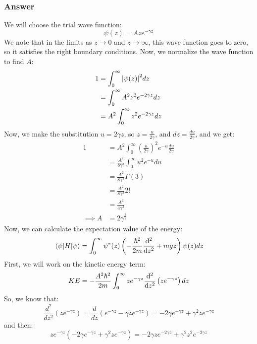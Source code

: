 \documentclass{article}[16pt]
\begin{document}
\subsubsection{Answer}
We will choose the trial wave function:
\begin{equation}
    \psi(z) = Aze^{-\gamma  z}
\end{equation}
We note that in the limits as $z \to 0$ and $z \to \infty$, this wave function goes to zero, so it satisfies the right boundary conditions. Now, we normalize the wave function to find $A$:
\begin{align*}
    1 &= \int_{0}^{\infty} \abs{\psi(z)}^2 dz \\
    &= \int_{0}^{\infty} A^2 z^2 e^{-2\gamma z} dz \\
    &= A^2 \int_{0}^{\infty} z^2 e^{-2\gamma z} dz \\
\end{align*}
Now, we make the substitution $u = 2\gamma z$, so $z = \frac{u}{2\gamma }$, and $dz = \frac{du}{2\gamma}$, and we get:
\begin{align*}
    1 &= A^2 \int_{0}^{\infty} \left(\frac{u}{2\gamma}\right)^2 e^{-u} \frac{du}{2\gamma} \\
    &= \frac{A^2}{8\gamma^3} \int_{0}^{\infty} u^2 e^{-u} du \\
    &= \frac{A^2}{8\gamma^3} \Gamma(3) \\
    &= \frac{A^2}{8\gamma^3} 2! \\
    &= \frac{A^2}{4\gamma^3} \\
    \implies A &= \boxed{2\gamma^{\frac{3}{2}}}
\end{align*}
Now, we can calculate the expectation value of the energy:
\begin{equation}
    \expval{H}{\psi} = \int_{0}^{\infty} \psi^*(z) \left(-\frac{\hbar^2}{2m} \dv[2]{z} + mgz\right) \psi(z) dz
\end{equation}
First, we will work on the kinetic energy term:
\begin{align*}
    KE &= -\frac{A^2\hbar^2}{2m} \int_{0}^{\infty} ze^{-\gamma z} \dv[2]{z} \left(ze^{-\gamma z}\right) dz \\
\end{align*}
So, we know that:
\begin{equation}
    \frac{d^2}{dz^2} \left(ze^{-\gamma z}\right) = \frac{d}{dz} \left(e^{-\gamma z} - \gamma ze^{-\gamma z}\right) = -2\gamma e^{-\gamma z} + \gamma^2 ze^{-\gamma z}
\end{equation}
and then:
\begin{equation}
    ze^{-\gamma z} \left(-2\gamma e^{-\gamma z} + \gamma^2 ze^{-\gamma z}\right) = -2\gamma z e^{-2\gamma z} + \gamma^2 z^2 e^{-2\gamma z}
\end{equation}
\end{document}
